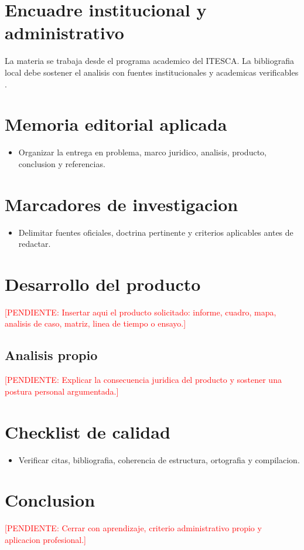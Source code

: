 \documentclass[12pt,letterpaper,oneside]{article}
\newcommand{\pendiente}[1]{\textcolor{red}{[PENDIENTE: #1]}}
\begin{document}
\section{Encuadre institucional y administrativo}
La materia se trabaja desde el programa academico del ITESCA. La bibliografia
local debe sostener el analisis con fuentes institucionales y academicas
verificables \citep{itescaProgramaFundamentosGestion,robbinsCoulter2018Administracion}.

\section{Memoria editorial aplicada}
\begin{itemize}
  \item Organizar la entrega en problema, marco juridico, analisis, producto, conclusion y referencias.
\end{itemize}

\section{Marcadores de investigacion}
\begin{itemize}
  \item Delimitar fuentes oficiales, doctrina pertinente y criterios aplicables antes de redactar.
\end{itemize}

\section{Desarrollo del producto}
\pendiente{Insertar aqui el producto solicitado: informe, cuadro, mapa, analisis de caso, matriz, linea de tiempo o ensayo.}

\subsection{Analisis propio}
\pendiente{Explicar la consecuencia juridica del producto y sostener una postura personal argumentada.}

\section{Checklist de calidad}
\begin{itemize}
  \item Verificar citas, bibliografia, coherencia de estructura, ortografia y compilacion.
\end{itemize}

\section{Conclusion}
\pendiente{Cerrar con aprendizaje, criterio administrativo propio y aplicacion profesional.}

\clearpage
\nocite{itescaProgramaFundamentosGestion,robbinsCoulter2018Administracion}

\end{document}
